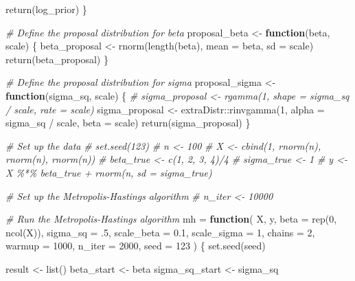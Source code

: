 \documentclass[
  letterpaper,
]{krantz}
\newenvironment{Shaded}{}{}
\newcommand{\AttributeTok}[1]{\textcolor[rgb]{0.49,0.56,0.16}{#1}}
\newcommand{\CommentTok}[1]{\textcolor[rgb]{0.38,0.63,0.69}{\textit{#1}}}
\newcommand{\ControlFlowTok}[1]{\textcolor[rgb]{0.00,0.44,0.13}{\textbf{#1}}}
\newcommand{\DecValTok}[1]{\textcolor[rgb]{0.25,0.63,0.44}{#1}}
\newcommand{\FloatTok}[1]{\textcolor[rgb]{0.25,0.63,0.44}{#1}}
\newcommand{\FunctionTok}[1]{\textcolor[rgb]{0.02,0.16,0.49}{#1}}
\newcommand{\NormalTok}[1]{#1}
\newcommand{\OtherTok}[1]{\textcolor[rgb]{0.00,0.44,0.13}{#1}}
\newcommand{\SpecialCharTok}[1]{\textcolor[rgb]{0.25,0.44,0.63}{#1}}
\begin{document}
\begin{Shaded}
\begin{Highlighting}[]
    \FunctionTok{return}\NormalTok{(log\_prior)}
\NormalTok{\}}

\CommentTok{\# Define the proposal distribution for beta}
\NormalTok{proposal\_beta }\OtherTok{\textless{}{-}} \ControlFlowTok{function}\NormalTok{(beta, scale) \{}
\NormalTok{    beta\_proposal }\OtherTok{\textless{}{-}} \FunctionTok{rnorm}\NormalTok{(}\FunctionTok{length}\NormalTok{(beta), }\AttributeTok{mean =}\NormalTok{ beta, }\AttributeTok{sd =}\NormalTok{ scale)}
    \FunctionTok{return}\NormalTok{(beta\_proposal)}
\NormalTok{\}}

\CommentTok{\# Define the proposal distribution for sigma}
\NormalTok{proposal\_sigma }\OtherTok{\textless{}{-}} \ControlFlowTok{function}\NormalTok{(sigma\_sq, scale) \{}
    \CommentTok{\# sigma\_proposal \textless{}{-} rgamma(1, shape = sigma\_sq / scale, rate = scale)}
\NormalTok{    sigma\_proposal }\OtherTok{\textless{}{-}}\NormalTok{ extraDistr}\SpecialCharTok{::}\FunctionTok{rinvgamma}\NormalTok{(}\DecValTok{1}\NormalTok{, }\AttributeTok{alpha =}\NormalTok{ sigma\_sq }\SpecialCharTok{/}\NormalTok{ scale, }\AttributeTok{beta =}\NormalTok{ scale)}
    \FunctionTok{return}\NormalTok{(sigma\_proposal)}
\NormalTok{\}}

\CommentTok{\# Set up the data}
\CommentTok{\# set.seed(123)}
\CommentTok{\# n \textless{}{-} 100}
\CommentTok{\# X \textless{}{-} cbind(1, rnorm(n), rnorm(n), rnorm(n))}
\CommentTok{\# beta\_true \textless{}{-} c(1, 2, 3, 4)/4}
\CommentTok{\# sigma\_true \textless{}{-} 1}
\CommentTok{\# y \textless{}{-} X \%*\% beta\_true + rnorm(n, sd = sigma\_true)}

\CommentTok{\# Set up the Metropolis{-}Hastings algorithm}
\CommentTok{\# n\_iter \textless{}{-} 10000}


\CommentTok{\# Run the Metropolis{-}Hastings algorithm}
\NormalTok{mh }\OtherTok{=} \ControlFlowTok{function}\NormalTok{(}
\NormalTok{    X,}
\NormalTok{    y,}
    \AttributeTok{beta =} \FunctionTok{rep}\NormalTok{(}\DecValTok{0}\NormalTok{, }\FunctionTok{ncol}\NormalTok{(X)), }
    \AttributeTok{sigma\_sq =}\NormalTok{ .}\DecValTok{5}\NormalTok{, }
    \AttributeTok{scale\_beta =} \FloatTok{0.1}\NormalTok{, }
    \AttributeTok{scale\_sigma =} \DecValTok{1}\NormalTok{,}
    \AttributeTok{chains =} \DecValTok{2}\NormalTok{,}
    \AttributeTok{warmup =} \DecValTok{1000}\NormalTok{,}
    \AttributeTok{n\_iter =} \DecValTok{2000}\NormalTok{,}
    \AttributeTok{seed =} \DecValTok{123}
\NormalTok{) \{}
    \FunctionTok{set.seed}\NormalTok{(seed)}

\NormalTok{    result }\OtherTok{\textless{}{-}} \FunctionTok{list}\NormalTok{()}
\NormalTok{    beta\_start }\OtherTok{\textless{}{-}}\NormalTok{ beta}
\NormalTok{    sigma\_sq\_start }\OtherTok{\textless{}{-}}\NormalTok{ sigma\_sq}


\end{Highlighting}
\end{Shaded}
\end{document}

